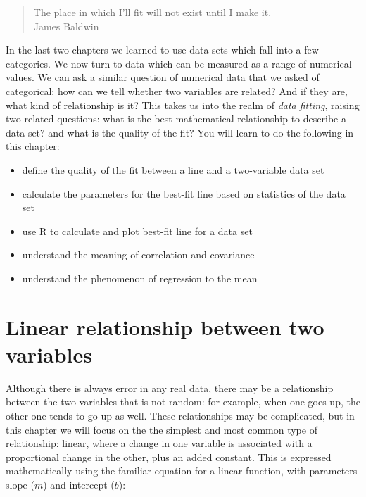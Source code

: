 \documentclass[
]{book}
\providecommand{\tightlist}{%
  \setlength{\itemsep}{0pt}\setlength{\parskip}{0pt}}
\theoremstyle{definition}
\theoremstyle{definition}
\theoremstyle{definition}
\theoremstyle{remark}
\begin{document}
\begin{quote}
The place in which I'll fit will not exist until I make it.\\
James Baldwin
\end{quote}

In the last two chapters we learned to use data sets which fall into a few categories. We now turn to data which can be measured as a range of numerical values. We can ask a similar question of numerical data that we asked of categorical: how can we tell whether two variables are related? And if they are, what kind of relationship is it? This takes us into the realm of \emph{data fitting}, raising two related questions: what is the best mathematical relationship to describe a data set? and what is the quality of the fit? You will learn to do the following in this chapter:

\begin{itemize}
\tightlist
\item
  define the quality of the fit between a line and a two-variable data set
\item
  calculate the parameters for the best-fit line based on statistics of the data set
\item
  use R to calculate and plot best-fit line for a data set
\item
  understand the meaning of correlation and covariance
\item
  understand the phenomenon of regression to the mean
\end{itemize}

\hypertarget{linear-relationship-between-two-variables}{%
\section{Linear relationship between two variables}\label{linear-relationship-between-two-variables}}

\label{sec:model8}

Although there is always error in any real data, there may be a relationship between the two variables that is not random: for example, when one goes up, the other one tends to go up as well. These relationships may be complicated, but in this chapter we will focus on the the simplest and most common type of relationship: linear, where a change in one variable is associated with a proportional change in the other, plus an added constant. This is expressed mathematically using the familiar equation for a linear function, with parameters slope (\(m\)) and intercept (\(b\)):
\end{document}
